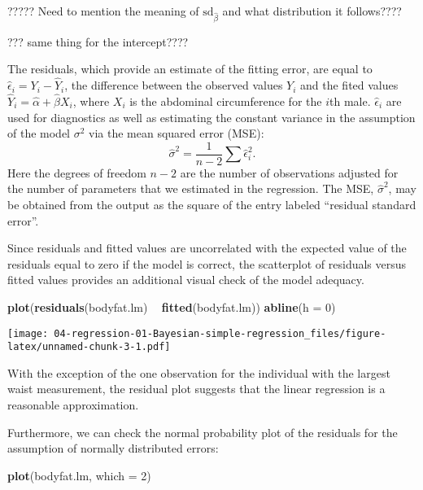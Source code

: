 \documentclass[]{book}
\newenvironment{Shaded}{\begin{snugshade}}{\end{snugshade}}
\newcommand{\KeywordTok}[1]{\textcolor[rgb]{0.13,0.29,0.53}{\textbf{#1}}}
\newcommand{\DataTypeTok}[1]{\textcolor[rgb]{0.13,0.29,0.53}{#1}}
\newcommand{\DecValTok}[1]{\textcolor[rgb]{0.00,0.00,0.81}{#1}}
\newcommand{\StringTok}[1]{\textcolor[rgb]{0.31,0.60,0.02}{#1}}
\newcommand{\OperatorTok}[1]{\textcolor[rgb]{0.81,0.36,0.00}{\textbf{#1}}}
\newcommand{\NormalTok}[1]{#1}
\theoremstyle{definition}
\theoremstyle{definition}
\theoremstyle{definition}
\theoremstyle{remark}
\begin{document}
????? Need to mention the meaning of \(\text{sd}_{\hat{\beta}}\) and
what distribution it follows????

??? same thing for the intercept????

The residuals, which provide an estimate of the fitting error, are equal
to \(\hat{\epsilon}_i = Y_i - \hat{Y}_i\), the difference between the
observed values \(Y_i\) and the fited values
\(\hat{Y}_i = \hat{\alpha} + \hat{\beta}X_i\), where \(X_i\) is the
abdominal circumference for the \(i\)th male. \(\hat{\epsilon}_i\) are
used for diagnostics as well as estimating the constant variance in the
assumption of the model \(\sigma^2\) via the mean squared error (MSE):
\[ \hat{\sigma}^2 = \frac{1}{n-2}\sum \hat{\epsilon}_i^2. \] Here the
degrees of freedom \(n-2\) are the number of observations adjusted for
the number of parameters that we estimated in the regression. The MSE,
\(\hat{\sigma}^2\), may be obtained from the output as the square of the
entry labeled ``residual standard error''.

Since residuals and fitted values are uncorrelated with the expected
value of the residuals equal to zero if the model is correct, the
scatterplot of residuals versus fitted values provides an additional
visual check of the model adequacy.

\begin{Shaded}
\begin{Highlighting}[]
\KeywordTok{plot}\NormalTok{(}\KeywordTok{residuals}\NormalTok{(bodyfat.lm) }\OperatorTok{~}\StringTok{ }\KeywordTok{fitted}\NormalTok{(bodyfat.lm))}
\KeywordTok{abline}\NormalTok{(}\DataTypeTok{h =} \DecValTok{0}\NormalTok{)}
\end{Highlighting}
\end{Shaded}

\texttt{[image: 04-regression-01-Bayesian-simple-regression\_files/figure-latex/unnamed-chunk-3-1.pdf]}

With the exception of the one observation for the individual with the
largest waist measurement, the residual plot suggests that the linear
regression is a reasonable approximation.

Furthermore, we can check the normal probability plot of the residuals
for the assumption of normally distributed errors:

\begin{Shaded}
\begin{Highlighting}[]
\KeywordTok{plot}\NormalTok{(bodyfat.lm, }\DataTypeTok{which =} \DecValTok{2}\NormalTok{)}
\end{Highlighting}
\end{Shaded}
\end{document}
